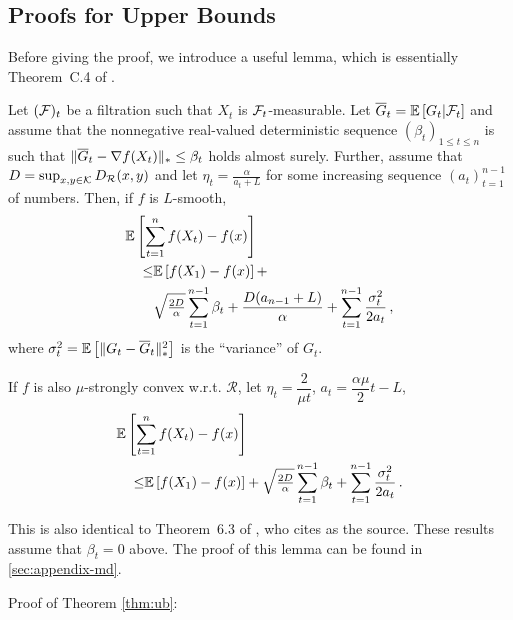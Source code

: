 \subsection{Proofs for Upper Bounds}
\label{sec:ub-proof}

Before giving the proof, we introduce a useful lemma, which is essentially Theorem~C.4 of \cite{MahdaviPhd:2014}.
\begin{lemma}
\label{lem:ub}
Let $({\mathcal{F}})_{t}$ be a filtration such that $X_t$ is ${\mathcal{F}}_t$-measurable.
Let $\overline G_t = \mathbb{E}\left[G_t|{\mathcal{F}}_t\right]$ 
and assume that the nonnegative real-valued deterministic sequence $(\beta_t)_{1\le t\le n}$ is such that 
$\|\overline G_t - \nabla {f}(X_t)\|_* \le \beta_t$ holds almost surely. 
Further, assume that $D=\sup_{x,y\in \mathcal{K}} D_{\mathcal{R}}(x,y)$ and let $\eta_t = \frac{\alpha}{a_t+L}$ for some increasing 
sequence $(a_t)_{t=1}^{n-1}$ of numbers. Then, if ${f}$ is $L$-smooth,
\begin{align*}
\MoveEqLeft \EE{ \sum_{t=1}^n {f}(X_t) - {f}(x) }  \\
\le& 	 \EE{{f}(X_1)-{f}(x)}+ \\
 & \sqrt{\tfrac{2D}{\alpha}} \sum_{t=1}^{n-1} \beta_t 
 +\frac{D(a_{n-1}+L)}{\alpha} +
	  \sum_{t=1}^{n-1}\frac{\sigma_t^2}{2a_t}\,,
\end{align*}
where $\sigma_t^2 = \mathbb{E}\left[ \|G_t-\overline G_t\|_*^2\right]$ is the ``variance'' of $G_t$.

If ${f}$ is also $\mu$-strongly convex w.r.t. $\mathcal{R}$, let $\eta_t = \dfrac{2}{\mu t}$, $a_t = \dfrac{\alpha \mu}{2}t-L$,
\begin{align*}
\MoveEqLeft \EE{ \sum_{t=1}^n {f}(X_t) - {f}(x) }  \\
\le& 	 \EE{{f}(X_1)-{f}(x)}+ 
 \sqrt{\tfrac{2D}{\alpha}} \sum_{t=1}^{n-1} \beta_t 
 +\sum_{t=1}^{n-1}\frac{\sigma_t^2}{2a_t}\,.
\end{align*}
\end{lemma}
This is also identical to Theorem~6.3 of \cite{Bu:Convex14}, who cites \cite{Dekel:minibatch12} as the source. These results assume that $\beta_t=0$ above.
The proof of this lemma can be found in \cref{sec:appendix-md}.

Proof of Theorem \ref{thm:ub}:

